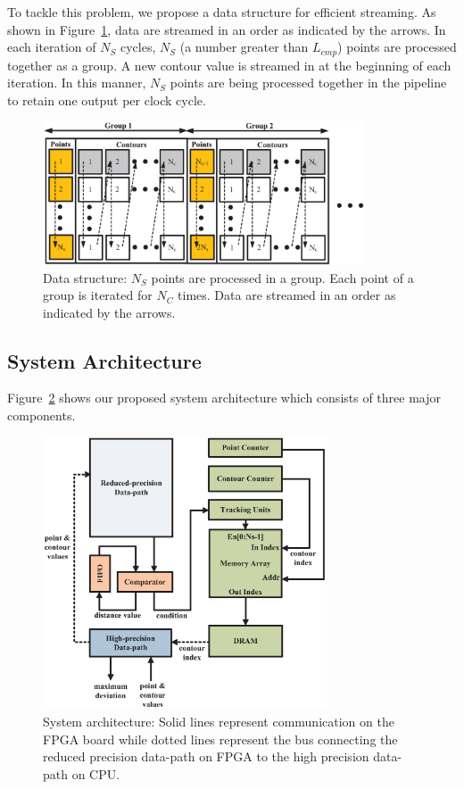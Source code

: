 To tackle this problem, we propose a data structure for efficient streaming.
As shown in Figure~\ref{fig:precision_stream}, data are streamed in an order as indicated by the arrows.
In each iteration of $N_S$ cycles, $N_{S}$ (a number greater than $L_{cmp}$) points are processed together as a group.
A new contour value is streamed in at the beginning of each iteration.
In this manner, $N_{S}$ points are being processed together in the pipeline to retain one output per clock cycle.

\begin{figure}[ht]
\begin{center}
\includegraphics[width=0.85\textwidth]{3_precision/figures/stream}
\end{center}
\caption{Data structure: 
$N_S$ points are processed in a group. 
Each point of a group is iterated for $N_C$ times.
Data are streamed in an order as indicated by the arrows.}
\label{fig:precision_stream}
\end{figure}

\subsection{System Architecture}
Figure~\ref{fig:precision_arch} shows our proposed system architecture which consists of three major components.

\begin{figure}[t!]
\begin{center}
\includegraphics[width=0.75\textwidth]{3_precision/figures/arch}
\end{center}
\caption{System architecture:
Solid lines represent communication on the FPGA board while dotted lines represent the bus connecting the reduced precision data-path on FPGA to the high precision data-path on CPU.
}
\label{fig:precision_arch}
\end{figure}


